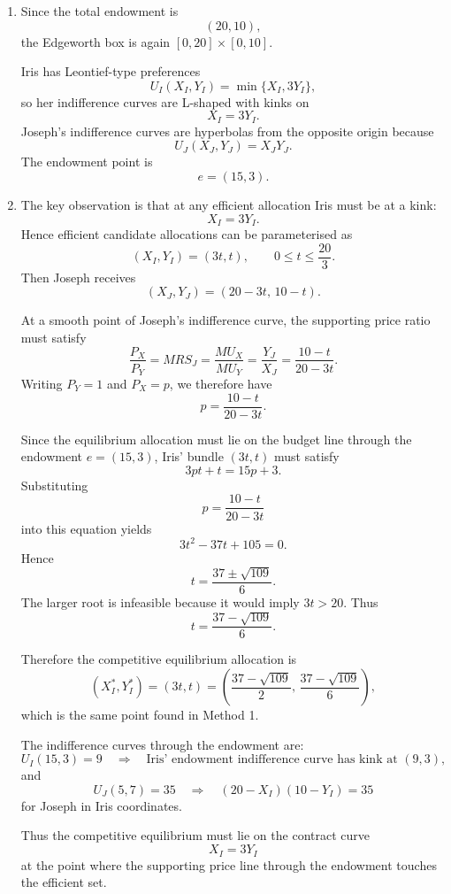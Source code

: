 \documentclass[12pt]{article}
\begin{document}
\begin{enumerate}[label=(\alph*)]
    \item
    Since the total endowment is
    \[
    (20,10),
    \]
    the Edgeworth box is again \([0,20]\times[0,10]\).

    Iris has Leontief-type preferences
    \[
    U_I(X_I,Y_I)=\min\{X_I,3Y_I\},
    \]
    so her indifference curves are L-shaped with kinks on
    \[
    X_I=3Y_I.
    \]
    Joseph's indifference curves are hyperbolas from the opposite origin because
    \[
    U_J(X_J,Y_J)=X_JY_J.
    \]
    The endowment point is
    \[
    e=(15,3).
    \]

    \item
    The key observation is that at any efficient allocation Iris must be at a kink:
    \[
    X_I=3Y_I.
    \]
    Hence efficient candidate allocations can be parameterised as
    \[
    (X_I,Y_I)=(3t,t),
    \qquad 0\le t\le \frac{20}{3}.
    \]
    Then Joseph receives
    \[
    (X_J,Y_J)=(20-3t,\,10-t).
    \]

    At a smooth point of Joseph's indifference curve, the supporting price ratio must satisfy
    \[
    \frac{P_X}{P_Y}=MRS_J=\frac{MU_X}{MU_Y}
    =\frac{Y_J}{X_J}
    =\frac{10-t}{20-3t}.
    \]
    Writing \(P_Y=1\) and \(P_X=p\), we therefore have
    \[
    p=\frac{10-t}{20-3t}.
    \]

    Since the equilibrium allocation must lie on the budget line through the endowment \(e=(15,3)\), Iris' bundle \((3t,t)\) must satisfy
    \[
    3pt+t=15p+3.
    \]
    Substituting
    \[
    p=\frac{10-t}{20-3t}
    \]
    into this equation yields
    \[
    3t^2-37t+105=0.
    \]
    Hence
    \[
    t=\frac{37\pm \sqrt{109}}{6}.
    \]
    The larger root is infeasible because it would imply \(3t>20\). Thus
    \[
    t=\frac{37-\sqrt{109}}{6}.
    \]

    Therefore the competitive equilibrium allocation is
    \[
    (X_I^*,Y_I^*)=(3t,t)
    =
    \left(\frac{37-\sqrt{109}}{2},\,\frac{37-\sqrt{109}}{6}\right),
    \]
    which is the same point found in Method 1.

    The indifference curves through the endowment are:
    \[
    U_I(15,3)=9
    \quad\Longrightarrow\quad
    \text{Iris' endowment indifference curve has kink at }(9,3),
    \]
    and
    \[
    U_J(5,7)=35
    \quad\Longrightarrow\quad
    (20-X_I)(10-Y_I)=35
    \]
    for Joseph in Iris coordinates.

    Thus the competitive equilibrium must lie on the contract curve
    \[
    X_I=3Y_I
    \]
    at the point where the supporting price line through the endowment touches the efficient set.


\end{enumerate}
\end{document}
